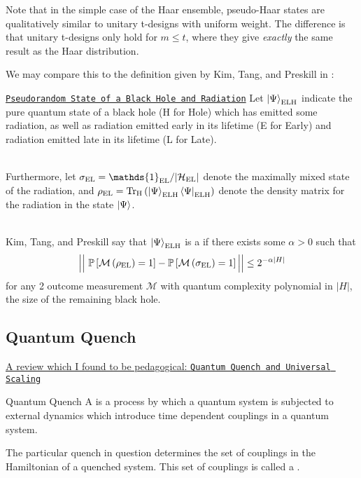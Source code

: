 Note that in the simple case of the Haar ensemble, pseudo-Haar states are qualitatively similar to unitary t-designs with uniform weight.
%
The difference is that unitary t-designs only hold for \(m \leq t\), where they give \textit{exactly} the same result as the Haar distribution.

We may compare this to the definition given by Kim, Tang, and Preskill in \cite{Kim_2020}:

\begin{definition}{
\href{https://arxiv.org/pdf/2003.05451.pdf\#page=23\&zoom=200,0,700}
{\texttt{Pseudorandom State of a Black Hole and Radiation}}
}
{}
Let \(\ket{\Psi}_{\rm ELH}\) indicate the pure quantum state of a black hole (H for Hole) which has emitted some radiation, as well as radiation emitted early in its lifetime (E for Early) and radiation emitted late in its lifetime (L for Late).

~\\
Furthermore, let \(\sigma_{\rm EL} = \mathds{1}_{\rm EL} / |\mathcal{H}_{\rm EL}|\) denote the maximally mixed state of the radiation, and \(\rho_{\rm EL} = \Tr_{\rm H}\left(\ket{\Psi}_{\rm ELH}\bra{\Psi}_{\rm ELH} \right)\) denote the density matrix for the radiation in the state \(\ket{\Psi}\).

~\\
Kim, Tang, and Preskill say that \(\ket{\Psi}_{\rm ELH}\) is a  if there exists some \(\alpha > 0\) such that 
	\begin{equation}
	        \label{eqn:ktp_pseudorand}
		\Big|\Big|~
			\mathbb{P}\left[\mathcal{M}\left(\rho_{\rm EL}\right) = 1\right]
			-
			\mathbb{P}\left[\mathcal{M}\left(\sigma_{\rm EL}\right) = 1\right]
		\Big|\Big|
		\leq
		2^{-\alpha|H|}
	\end{equation}
for any 2 outcome measurement \(\mathcal{M}\) with quantum complexity polynomial in \(|H|\), the size of the remaining black hole.
\end{definition}



\subsection{Quantum Quench}

\href{https://oxfordre.com/physics/view/10.1093/acrefore/9780190871994.001.0001/acrefore-9780190871994-e-55}{A review which I found to be pedagogical: \texttt{Quantum Quench and Universal Scaling}}

\begin{definition}{Quantum Quench}{}
    A  is a process by which a quantum system is subjected to external dynamics which introduce time dependent couplings in a quantum system.

    The particular quench in question determines the set of couplings in the Hamiltonian of a quenched system.
    This set of couplings is called a .
\end{definition}

